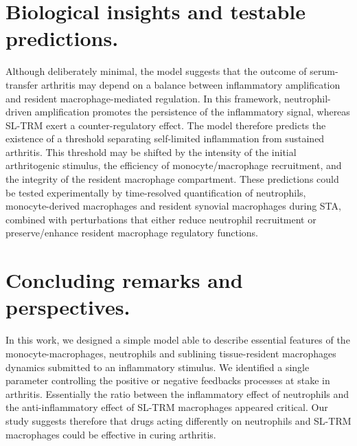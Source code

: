 \documentclass[a4paper, 12pt]{article}
\begin{document}
\section{Biological insights and testable predictions.}\label{sec:insights_predictions}
Although deliberately minimal, 
the model suggests that the outcome of serum-transfer arthritis may depend on a balance between inflammatory amplification and resident macrophage-mediated regulation. 
In this framework, neutrophil-driven amplification promotes the persistence of the inflammatory signal, whereas SL-TRM exert a counter-regulatory effect. 
The model therefore predicts the existence of a threshold separating self-limited inflammation from sustained arthritis. 
This threshold may be shifted by the intensity of the initial arthritogenic stimulus, the efficiency of monocyte/macrophage recruitment, and the integrity of the resident macrophage compartment. 
These predictions could be tested experimentally by time-resolved quantification of neutrophils, monocyte-derived macrophages and resident synovial macrophages during STA, 
combined with perturbations that either reduce neutrophil recruitment or preserve/enhance resident macrophage regulatory functions.



\section{Concluding remarks and perspectives.}\label{sec:conclusion} In this work, we designed a simple model able to describe essential features of the monocyte-macrophages, neutrophils and sublining tissue-resident macrophages dynamics
 submitted to an inflammatory stimulus.
We identified a single parameter controlling the positive or negative feedbacks processes at stake in arthritis. 
Essentially the ratio between the inflammatory effect of neutrophils and the anti-inflammatory effect of SL-TRM macrophages appeared critical. 
Our study suggests therefore that drugs acting differently on neutrophils and SL-TRM macrophages could be effective in curing arthritis.
\end{document}
